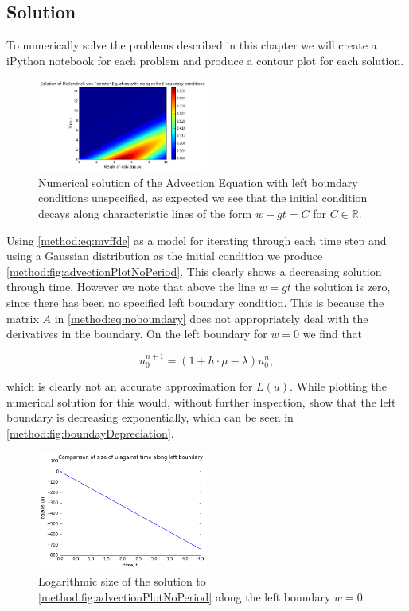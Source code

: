 \documentclass[../main.tex]{subfiles}
\begin{document}
  \subsection{Solution}
  To numerically solve the problems described in this chapter we will create a iPython notebook for each problem and produce a contour plot for each solution.

  \begin{figure}[htb]
    \centering
    \includegraphics[width=0.5\textwidth]{_assets/advection_noPeriod.png}
    \caption{\label{method:fig:advectionPlotNoPeriod} Numerical solution of the Advection Equation with left boundary conditions unspecified, as expected we see that the initial condition decays along characteristic lines of the form $w - g t = C$ for $C \in \mathbb{R}$.}
  \end{figure}

  Using \autoref{method:eq:mvffde} as a model for iterating through each time step and using a Gaussian distribution as the initial condition we produce \autoref{method:fig:advectionPlotNoPeriod}. This clearly shows a decreasing solution through time. However we note that above the line $w = gt$ the solution is zero, since there has been no specified left boundary condition. This is because the matrix $A$ in \autoref{method:eq:noboundary} does not appropriately deal with the derivatives in the boundary. On the left boundary for $w = 0$ we find that

  \begin{equation}
    u^{n+1}_0 = \left( 1 + h \cdot \mu - \lambda \right) u^n_0,
  \end{equation}

  which is clearly not an accurate approximation for $L(u)$. While plotting the numerical solution for this would, without further inspection, show that the left boundary is decreasing exponentially, which can be seen in \autoref{method:fig:boundayDepreciation}.

  \begin{figure}[htb]
    \centering
    \includegraphics[width=0.5\textwidth]{_assets/uBoundary.png}
    \caption{\label{method:fig:boundayDepreciation} Logarithmic size of the solution to \autoref{method:fig:advectionPlotNoPeriod} along the left boundary $w = 0$.}
  \end{figure}
\end{document}
